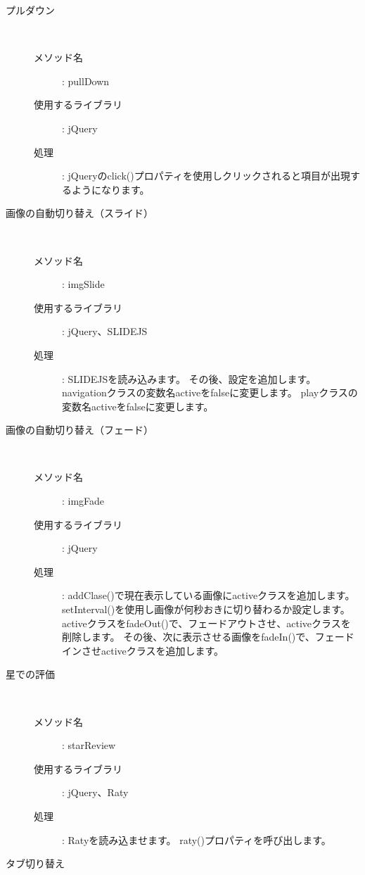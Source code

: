 \documentclass[a4j,titlepage]{jarticle}
\begin{document}
\begin{description}
\item [プルダウン]~
  \begin{description}
    \item [メソッド名] : pullDown
    \item [使用するライブラリ] : jQuery
    \item [処理] : jQueryのclick()プロパティを使用しクリックされると項目が出現するようになります。
  \end{description}

\item [画像の自動切り替え（スライド）]~
  \begin{description}
    \item [メソッド名] : imgSlide
    \item [使用するライブラリ] : jQuery、SLIDEJS
    \item [処理] : SLIDEJSを読み込みます。
    その後、設定を追加します。
    navigationクラスの変数名activeをfalseに変更します。
    playクラスの変数名activeをfalseに変更します。
  \end{description}

\item[画像の自動切り替え（フェード）]~
  \begin{description}
    \item [メソッド名] : imgFade
    \item [使用するライブラリ] : jQuery
    \item [処理] : addClase()で現在表示している画像にactiveクラスを追加します。
    setInterval()を使用し画像が何秒おきに切り替わるか設定します。
    activeクラスをfadeOut()で、フェードアウトさせ、activeクラスを削除します。
    その後、次に表示させる画像をfadeIn()で、フェードインさせactiveクラスを追加します。
  \end{description}

\item[星での評価]~
  \begin{description}
    \item [メソッド名] : starReview
    \item [使用するライブラリ] : jQuery、Raty
    \item [処理] : Ratyを読み込ませます。
    raty()プロパティを呼び出します。
  \end{description}

\item[タブ切り替え]~\\
\end{description}
\end{document}
